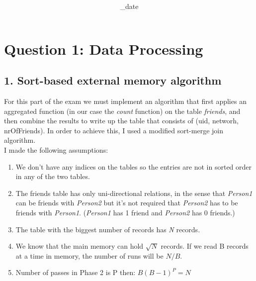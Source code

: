 \documentclass{article}      %
\title{\Course\\\Exam}
\author{\Studentname}
\date{\Sub_date}      %
\begin{document}

\maketitle                   %


\section*{Question 1: Data Processing} 

\subsection* {1. Sort-based external memory algorithm}

For this part of the exam we must implement an algorithm that first applies an aggregated function (in our case the \emph{count} function) on the table \emph{friends}, and then combine the results to write up the table that consists of (uid, networh, nrOfFriends). In order to achieve this, I used a modified sort-merge join algorithm.\\

I made the following assumptions:
\begin{enumerate}
\item
We don't have any indices on the tables so the entries are not in sorted order in any of the two tables.
\item  
The friends table has only uni-directional relations, in the sense that \emph{Person1} can be friends with \emph{Person2} but it's not required that \emph{Person2} has to be friends with \emph{Person1}. (\emph{Person1} has 1 friend and \emph{Person2} has 0 friends.)
\item
The table with the biggest number of records has \emph{N} records.
\item
We know that the main memory can hold \begin{math}\sqrt{N}\end{math} records. If we read B records at a time in memory, the number of runs will be \begin{math}N/B\end{math}.
\item 
Number of passes in Phase 2 is P then: \begin{math}B(B-1)^P = N\end{math}\\
 \end{enumerate}
\end{document}
